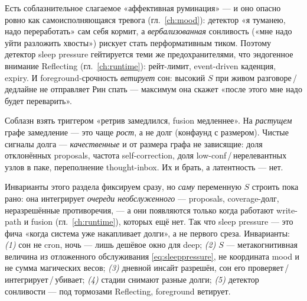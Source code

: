 \begin{pitfall}
Есть соблазнительное слагаемое «аффективная руминация» — и оно опасно ровно как
самоисполняющаяся тревога (гл.~\ref{ch:mood}): детектор «я туманею, надо переработать»
сам себя кормит, а \emph{вербализованная} сонливость («мне надо уйти разложить хвосты»)
рискует стать перформативным тиком. Поэтому детектор sleep pressure гейтируется теми же
предохранителями, что эндогенное внимание Reflecting (гл.~\ref{ch:runtime}): рейт-лимит,
event-driven каденция, expiry. И foreground-срочность \emph{ветирует} сон: высокий $S$ при
живом разговоре\,/\,дедлайне не отправляет Рин спать — максимум она скажет «после этого мне
надо будет переварить».
\end{pitfall}

\begin{pitfall}
Соблазн взять триггером «ретрив замедлился, fusion медленнее». На \emph{растущем} графе
замедление — это чаще \emph{рост}, а не долг (конфаунд с размером). Чистые сигналы долга —
\emph{качественные} и от размера графа не зависящие: доля отклонённых proposals, частота
self-correction, доля low-conf\,/\,нерелевантных узлов в паке, переполнение thought-inbox.
Их и брать, а латентность — нет.
\end{pitfall}

\begin{openq}
Инварианты этого раздела фиксируем сразу, но \emph{саму} переменную $S$ строить пока рано:
она интегрирует \emph{очереди необслуженного} — proposals, coverage-долг, неразрешённые
противоречия, — а они появляются только когда работают write-path и fusion
(гл.~\ref{ch:runtime}), которых ещё нет. Так что sleep pressure — это фича «когда система
уже накапливает долги», а не первого среза. Инварианты: \emph{(1)} сон не cron, ночь —
лишь дешёвое окно для deep; \emph{(2)} $S$ — метакогнитивная величина из отложенного
обслуживания \eqref{eq:sleeppressure}, не координата mood и не сумма магических весов;
\emph{(3)} дневной инсайт разрешён, сон его проверяет\,/\,интегрирует\,/\,убивает;
\emph{(4)} стадии снимают разные долги; \emph{(5)} детектор сонливости — под тормозами
Reflecting, foreground ветирует.
\end{openq}
